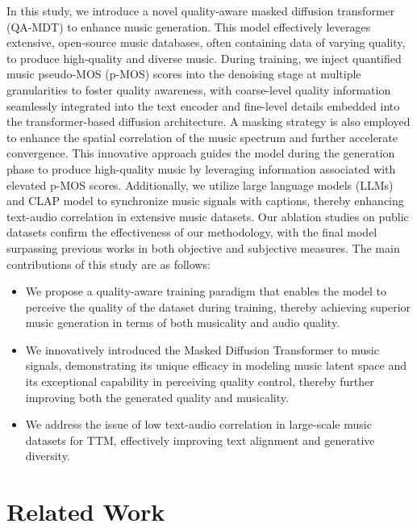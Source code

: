 In this study, we introduce a novel quality-aware masked diffusion transformer (QA-MDT) to enhance music generation. This model effectively leverages extensive, open-source music databases, often containing data of varying quality, to produce high-quality and diverse music. During training, we inject quantified music pseudo-MOS (p-MOS) scores into the denoising stage at multiple granularities to foster quality awareness, with coarse-level quality information seamlessly integrated into the text encoder and fine-level details embedded into the transformer-based diffusion architecture. A masking strategy is also employed to enhance the spatial correlation of the music spectrum and further accelerate convergence. This innovative approach guides the model during the generation phase to produce high-quality music by leveraging information associated with elevated p-MOS scores.
Additionally, we utilize large language models (LLMs) and CLAP model to synchronize music signals with captions, thereby enhancing text-audio correlation in extensive music datasets. Our ablation studies on public datasets confirm the effectiveness of our methodology, with the final model surpassing previous works in both objective and subjective measures.
The main contributions of this study are as follows:
\begin{itemize}
    \item We propose a quality-aware training paradigm that enables the model to perceive the quality of the dataset during training, thereby achieving superior music generation in terms of both musicality and audio quality.
    \item We innovatively introduced the Masked Diffusion Transformer to music signals, demonstrating its unique efficacy in modeling music latent space and its exceptional capability in perceiving quality control, thereby further improving both the generated quality and musicality.
    \item We address the issue of low text-audio correlation in large-scale music datasets for TTM, effectively improving text alignment and generative diversity.
\end{itemize}

\section{Related Work}\label{sec:rel}

